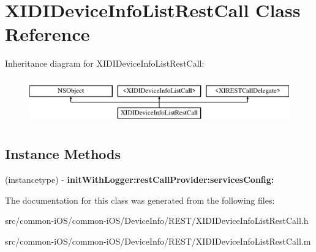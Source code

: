 \hypertarget{interface_x_i_d_i_device_info_list_rest_call}{}\section{X\+I\+D\+I\+Device\+Info\+List\+Rest\+Call Class Reference}
\label{interface_x_i_d_i_device_info_list_rest_call}
Inheritance diagram for X\+I\+D\+I\+Device\+Info\+List\+Rest\+Call\+:\begin{figure}[H]
\begin{center}
\leavevmode
\includegraphics[height=2.000000cm]{interface_x_i_d_i_device_info_list_rest_call}
\end{center}
\end{figure}
\subsection*{Instance Methods}
\begin{DoxyCompactItemize}
\item 
\hypertarget{interface_x_i_d_i_device_info_list_rest_call_a38d884da0ada4fefa9dcbbf35bab3392}{}\label{interface_x_i_d_i_device_info_list_rest_call_a38d884da0ada4fefa9dcbbf35bab3392} 
(instancetype) -\/ {\bfseries init\+With\+Logger\+:rest\+Call\+Provider\+:services\+Config\+:}
\end{DoxyCompactItemize}


The documentation for this class was generated from the following files\+:\begin{DoxyCompactItemize}
\item 
src/common-\/i\+O\+S/common-\/i\+O\+S/\+Device\+Info/\+R\+E\+S\+T/X\+I\+D\+I\+Device\+Info\+List\+Rest\+Call.\+h\item 
src/common-\/i\+O\+S/common-\/i\+O\+S/\+Device\+Info/\+R\+E\+S\+T/X\+I\+D\+I\+Device\+Info\+List\+Rest\+Call.\+m\end{DoxyCompactItemize}
